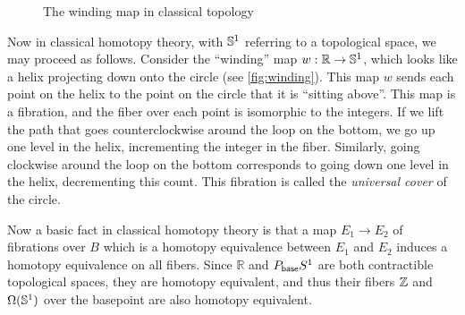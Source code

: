 \begin{figure}\centering
  \caption{The winding map in classical topology}\label{fig:winding}
\end{figure}

Now in classical homotopy theory, with $\mathbb{S}^1$ referring to a topological space, we may proceed as follows.
Consider the ``winding'' map $w:\mathbb{R}\to \mathbb{S} ^1$, which looks like a helix projecting down onto the circle (see \autoref{fig:winding}).
This map $w$ sends each point on the helix to the point on the circle that it is ``sitting above''.
This map is a fibration, and the fiber over each point is isomorphic to the integers.
If we lift the path that goes counterclockwise around the loop on the bottom, we go up one level in the helix, incrementing the integer in the fiber.
Similarly, going clockwise around the loop on the bottom corresponds to going down one level in the helix, decrementing this count.
This fibration is called the \emph{universal cover} of the circle.

Now a basic fact in classical homotopy theory is that a map $E_1\to E_2$ of fibrations over $B$ which is a homotopy equivalence between $E_1$ and $E_2$ induces a homotopy equivalence on all fibers.
Since $\mathbb{R}$ and $P_{\mathsf{base}} S^1$ are both contractible topological spaces, they are homotopy equivalent, and thus their fibers $\mathbb{Z}$ and $\Omega(\mathbb{S} ^1)$ over the basepoint are also homotopy equivalent.

